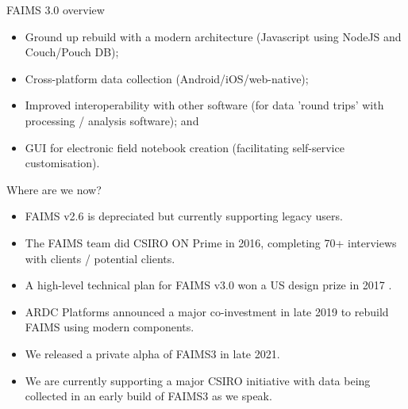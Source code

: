 
\begin{frame}{FAIMS 3.0 overview}

\begin{itemize}
    \item Ground up rebuild with a modern architecture (Javascript using NodeJS and Couch/Pouch DB);
    \item Cross-platform data collection (Android/iOS/web-native); 
    \item Improved interoperability with other software (for data 'round trips' with processing / analysis software); and
    \item GUI for electronic field notebook creation (facilitating self-service customisation).
\end{itemize}

\end{frame}

\begin{frame}{Where are we now?}
    \begin{itemize}
        \item FAIMS v2.6 is depreciated but currently supporting legacy users.
        \item The FAIMS team did CSIRO ON Prime in 2016, completing 70+ interviews with clients / potential clients.
        \item A high-level technical plan for FAIMS v3.0 won a US design prize in 2017 \parencite{Bureau_of_Reclamation2017-xl}.
        \item ARDC Platforms announced a major co-investment in late 2019 to rebuild FAIMS using modern components.
        \item We released a private alpha of FAIMS3 in late 2021.
        \item We are currently supporting a major CSIRO initiative with data being collected in an early build of FAIMS3 as we speak.
    \end{itemize}
\end{frame}


